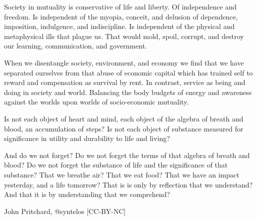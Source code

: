 Society in mutuality is conservative of life and liberty.  Of
independence and freedom.  Is independent of the myopia, conceit, and
delusion of dependence, imposition, indulgence, and indiscipline.  Is
independent of the physical and metaphysical ills that plague us.
That would mold, spoil, corrupt, and destroy our learning,
communication, and government.

When we disentangle society, environment, and economy we find that we
have separated ourselves from that abuse of economic capital which has
trained self to reward and compensation as survival by rent.  In
contrast, service as being and doing in society and world.  Balancing
the body budgets of energy and awareness against the worlds upon
worlds of socio-economic mutuality.

Is not each object of heart and mind, each object of the algebra of
breath and blood, an accumulation of steps?  Is not each object of
substance measured for significance in utility and durability to life
and living?

And do we not forget?  Do we not forget the terms of that algebra of
breath and blood?  Do we not forget the substance of life and the
significance of that substance?  That we breathe air?  That we eat
food?  That we have an impact yesterday, and a life tomorrow?  That is
is only by reflection that we understand?  And that it is by
understanding that we comprehend?

{\tail John Pritchard, @syntelos [CC-BY-NC]}

\bye
